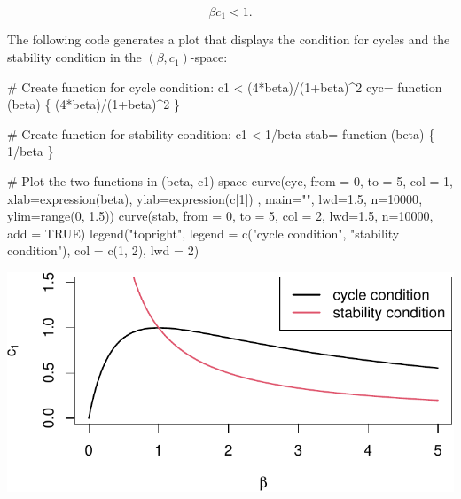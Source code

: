 \documentclass[
  letterpaper,
  DIV=11,
  numbers=noendperiod]{scrreprt}
\newenvironment{Shaded}{\begin{snugshade}}{\end{snugshade}}
\newcommand{\AttributeTok}[1]{\textcolor[rgb]{0.40,0.45,0.13}{#1}}
\newcommand{\CommentTok}[1]{\textcolor[rgb]{0.37,0.37,0.37}{#1}}
\newcommand{\ConstantTok}[1]{\textcolor[rgb]{0.56,0.35,0.01}{#1}}
\newcommand{\ControlFlowTok}[1]{\textcolor[rgb]{0.00,0.23,0.31}{#1}}
\newcommand{\DecValTok}[1]{\textcolor[rgb]{0.68,0.00,0.00}{#1}}
\newcommand{\FloatTok}[1]{\textcolor[rgb]{0.68,0.00,0.00}{#1}}
\newcommand{\FunctionTok}[1]{\textcolor[rgb]{0.28,0.35,0.67}{#1}}
\newcommand{\NormalTok}[1]{\textcolor[rgb]{0.00,0.23,0.31}{#1}}
\newcommand{\OtherTok}[1]{\textcolor[rgb]{0.00,0.23,0.31}{#1}}
\newcommand{\SpecialCharTok}[1]{\textcolor[rgb]{0.37,0.37,0.37}{#1}}
\newcommand{\StringTok}[1]{\textcolor[rgb]{0.13,0.47,0.30}{#1}}
\begin{document}
\[\beta c_1<1.\]

The following code generates a plot that displays the condition for
cycles and the stability condition in the \((\beta, c_1)\)-space:

\begin{Shaded}
\begin{Highlighting}[]
\CommentTok{\# Create function for cycle condition: c1 \textless{} (4*beta)/(1+beta)\^{}2}
\NormalTok{cyc}\OtherTok{=} \ControlFlowTok{function}\NormalTok{ (beta) \{}
\NormalTok{  (}\DecValTok{4}\SpecialCharTok{*}\NormalTok{beta)}\SpecialCharTok{/}\NormalTok{(}\DecValTok{1}\SpecialCharTok{+}\NormalTok{beta)}\SpecialCharTok{\^{}}\DecValTok{2}
\NormalTok{\}}

\CommentTok{\# Create function for stability condition: c1 \textless{} 1/beta}
\NormalTok{stab}\OtherTok{=} \ControlFlowTok{function}\NormalTok{ (beta) \{}
  \DecValTok{1}\SpecialCharTok{/}\NormalTok{beta}
\NormalTok{\}}

\CommentTok{\# Plot the two functions in (beta, c1){-}space}
\FunctionTok{curve}\NormalTok{(cyc, }\AttributeTok{from =} \DecValTok{0}\NormalTok{, }\AttributeTok{to =} \DecValTok{5}\NormalTok{, }\AttributeTok{col =} \DecValTok{1}\NormalTok{, }\AttributeTok{xlab=}\FunctionTok{expression}\NormalTok{(beta), }\AttributeTok{ylab=}\FunctionTok{expression}\NormalTok{(c[}\DecValTok{1}\NormalTok{]) , }\AttributeTok{main=}\StringTok{""}\NormalTok{,}
      \AttributeTok{lwd=}\FloatTok{1.5}\NormalTok{, }\AttributeTok{n=}\DecValTok{10000}\NormalTok{, }\AttributeTok{ylim=}\FunctionTok{range}\NormalTok{(}\DecValTok{0}\NormalTok{, }\FloatTok{1.5}\NormalTok{))}
\FunctionTok{curve}\NormalTok{(stab, }\AttributeTok{from =} \DecValTok{0}\NormalTok{, }\AttributeTok{to =} \DecValTok{5}\NormalTok{, }\AttributeTok{col =} \DecValTok{2}\NormalTok{, }\AttributeTok{lwd=}\FloatTok{1.5}\NormalTok{, }\AttributeTok{n=}\DecValTok{10000}\NormalTok{, }\AttributeTok{add =} \ConstantTok{TRUE}\NormalTok{)}
\FunctionTok{legend}\NormalTok{(}\StringTok{"topright"}\NormalTok{, }\AttributeTok{legend =} \FunctionTok{c}\NormalTok{(}\StringTok{"cycle condition"}\NormalTok{, }\StringTok{"stability condition"}\NormalTok{), }
       \AttributeTok{col =} \FunctionTok{c}\NormalTok{(}\DecValTok{1}\NormalTok{, }\DecValTok{2}\NormalTok{), }\AttributeTok{lwd =} \DecValTok{2}\NormalTok{)}
\end{Highlighting}
\end{Shaded}

\includegraphics{intro_stability_analysis_files/figure-pdf/stab_analysis6-2.pdf}
\end{document}
